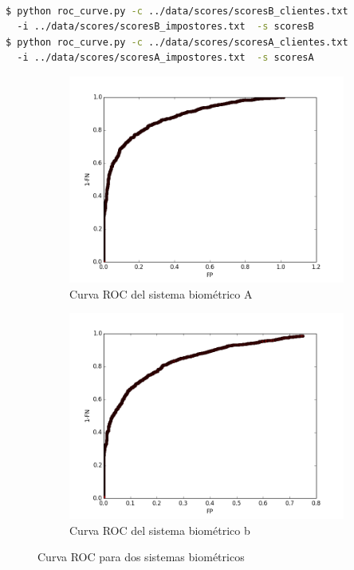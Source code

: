 \begin{lstlisting}[language=bash,label=roc:roc,caption=Calculo de la curva ROC para sistemas biométricos]

$ python roc_curve.py -c ../data/scores/scoresB_clientes.txt 
  -i ../data/scores/scoresB_impostores.txt  -s scoresB
$ python roc_curve.py -c ../data/scores/scoresA_clientes.txt 
  -i ../data/scores/scoresA_impostores.txt  -s scoresA

\end{lstlisting}

\begin{figure}[ht]
    \centering
        \begin{subfigure}[b]{0.5\textwidth}
                \centering
                \includegraphics[scale=0.4]{../roc/outputs/scoresA.png}
                \caption{Curva ROC del sistema biométrico A}
                \label{fig:rocA}
        \end{subfigure}%
        \begin{subfigure}[b]{0.5\textwidth}
                \centering
                \includegraphics[scale=0.4]{../roc/outputs/scoresB.png}
                \caption{Curva ROC del sistema biométrico b}
                \label{fig:rocB}
        \end{subfigure}
    \caption{Curva ROC para dos sistemas biométricos}\label{fig:roc_curve}
\end{figure}
\newpage
